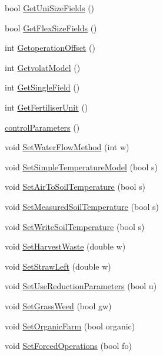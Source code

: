 \begin{DoxyCompactItemize}
\item 
bool \hyperlink{classcontrol_parameters_a1c35d1b5f556e75782eb0aa4fb87d063}{GetUniSizeFields} ()
\item 
bool \hyperlink{classcontrol_parameters_a24ac14f6b6a328d5fef572a44d005b46}{GetFlexSizeFields} ()
\item 
int \hyperlink{classcontrol_parameters_acff95f57e2cafa75d859bbee183e022c}{GetoperationOffset} ()
\item 
int \hyperlink{classcontrol_parameters_a26f96adcae0f550b87e320b6106e3367}{GetvolatModel} ()
\item 
int \hyperlink{classcontrol_parameters_af8b3337c8b5a01fc8608f896fcf1d71c}{GetSingleField} ()
\item 
int \hyperlink{classcontrol_parameters_a62f2ca9fc634e6bd4203a583f2f50530}{GetFertiliserUnit} ()
\item 
\hyperlink{classcontrol_parameters_a2acc732d4c073abc5f69df32d2aa0006}{controlParameters} ()
\item 
void \hyperlink{classcontrol_parameters_af45477e3d79e2fcc8e34848c94b74a33}{SetWaterFlowMethod} (int w)
\item 
void \hyperlink{classcontrol_parameters_a0c870fc072987d313076610284d36db8}{SetSimpleTemperatureModel} (bool s)
\item 
void \hyperlink{classcontrol_parameters_a380e78599a9b1b63d6d714e33010dab0}{SetAirToSoilTemperature} (bool s)
\item 
void \hyperlink{classcontrol_parameters_a267ebd9b1c69e4cba12fdbe9d4fb4ac6}{SetMeasuredSoilTemperature} (bool s)
\item 
void \hyperlink{classcontrol_parameters_a78a8f1dfd93321ab943ebfa1a6738a1e}{SetWriteSoilTemperature} (bool s)
\item 
void \hyperlink{classcontrol_parameters_a41e0a4ebe351184ecebbdb62664a0ff4}{SetHarvestWaste} (double w)
\item 
void \hyperlink{classcontrol_parameters_a53e0b5bcf58eea96908fd3b974e4dd15}{SetStrawLeft} (double w)
\item 
void \hyperlink{classcontrol_parameters_ab3723111e5bbd3b9a8784182b39f8a36}{SetUseReductionParameters} (bool u)
\item 
void \hyperlink{classcontrol_parameters_a63237c5736c6740c5b9c80f0542b81b8}{SetGrassWeed} (bool gw)
\item 
void \hyperlink{classcontrol_parameters_a52407c9d80f3f391105c8cd6b04cc409}{SetOrganicFarm} (bool organic)
\item 
void \hyperlink{classcontrol_parameters_ac7145a68ee259d6219773c15895732b7}{SetForcedOperations} (bool fo)

\end{DoxyCompactItemize}
